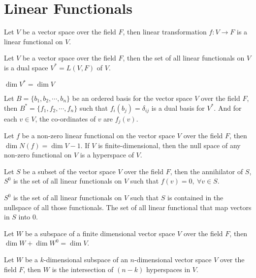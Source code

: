 \section{Linear Functionals}
	\begin{definition}
		Let $V$ be a vector space over the field $F$, then linear transformation $f : V \to F$ is a linear functional on $V$.
	\end{definition}
	\begin{definition}
		Let $V$ be a vector space over the field $F$, then the set of all linear functionals on $V$ is a dual space $V^* = L(V,F)$ of $V$.
	\end{definition}
	\begin{remark} $\dim V^* = \dim V$
	\end{remark}
	\begin{theorem}
		Let $B = \{ b_1, b_2, \cdots, b_n \}$ be an ordered basis for the vector space $V$ over the field $F$, then $B^* = \{ f_1, f_2, \cdots, f_n \}$ such that $f_i(b_j) = \delta_{ij}$ is a dual basis for $V^*$. And for each $v \in V$, the co-ordinates of $v$ are $f_j(v)$.
	\end{theorem}
	\begin{remark}
		Let $f$ be a non-zero linear functional on the vector space $V$ over the field $F$, then $\dim N(f) = \dim V - 1$. If $V$ is finite-dimensional, then the null space of any non-zero functional on $V$ is a hyperspace of $V$.
	\end{remark}
	\begin{definition}
		Let $S$ be a subset of the vector space $V$ over the field $F$, then the annihilator of $S$, $S^0$ is the set of all linear functionals on $V$ such that $f(v) = 0,\ \forall v \in S$.
	\end{definition}
	\begin{remark}
		$S^0$ is the set of all linear functionals on $V$ such that $S$ is contained in the nullspace of all those functionals. The set of all linear functional that map vectors in $S$ into $0$.
	\end{remark}
	\begin{theorem}
		Let $W$ be a subspace of a finite dimensional vector space $V$ over the field $F$, then $\dim W + \dim W^0 = \dim V$.
	\end{theorem}
	\begin{corollary}
		Let $W$ be a $k$-dimensional subspace of an $n$-dimensional vector space $V$ over the field $F$, then $W$ is the intersection of $(n-k)$ hyperspaces in $V$.
	\end{corollary}
